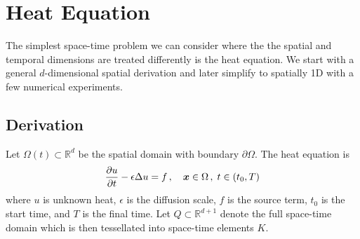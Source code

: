 \documentclass[Dissertation.tex]{subfiles}
\begin{document}
%                                          
%                                          
%  
\section{Heat Equation}
The simplest space-time problem we can consider where the the spatial and temporal dimensions are treated differently is the heat equation.
We start with a general $d$-dimensional spatial derivation and later simplify to spatially 1D with a few numerical experiments.

\subsection{Derivation}
Let $\Omega(t)\subset\mathbb{R}^d$ be the spatial domain with boundary $\partial\Omega$.
The heat equation is
\begin{equation}
	\frac{\partial u}{\partial t}-\epsilon\Delta u=f\,,\quad\boldsymbol x\in\Omega\,,\;t\in(t_0,T)
\end{equation}
where $u$ is unknown heat, $\epsilon$ is the diffusion scale, $f$ is the source term, $t_0$ is the start time, and $T$ is the final time.
Let $Q\subset\mathbb{R}^{d+1}$ denote the full space-time domain which is then tessellated into space-time elements $K$.
\end{document}
